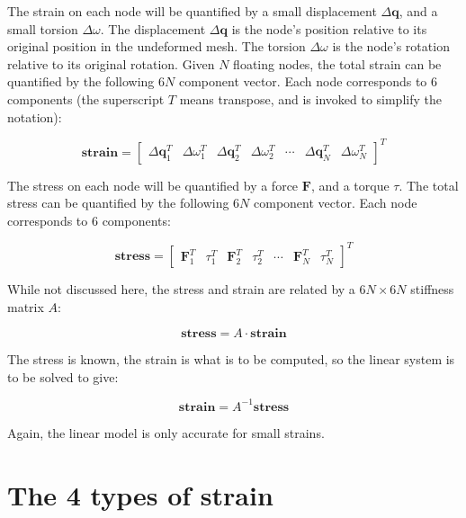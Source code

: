 \documentclass{article}
\begin{document}
The strain on each node will be quantified by a small displacement \(\Delta\mathbf{q}\), and a small torsion \(\Delta\omega\). The displacement \(\Delta\mathbf{q}\) is the node's position relative to its original position in the undeformed mesh. The torsion \(\Delta\omega\) is the node's rotation relative to its original rotation. Given \(N\) floating nodes, the total strain can be quantified by the following \(6N\) component vector. Each node corresponds to \(6\) components (the superscript \(T\) means transpose, and is invoked to simplify the notation):

\[\textbf{strain} = \begin{bmatrix} \Delta\mathbf{q}_1^T & \Delta\omega_1^T & \Delta\mathbf{q}_2^T & \Delta\omega_2^T & \cdots & \Delta\mathbf{q}_N^T & \Delta\omega_N^T \end{bmatrix}^T\] 

The stress on each node will be quantified by a force \(\mathbf{F}\), and a torque \(\tau\). The total stress can be quantified by the following \(6N\) component vector. Each node corresponds to \(6\) components:

\[\textbf{stress} = \begin{bmatrix} \mathbf{F}_1^T & \tau_1^T & \mathbf{F}_2^T & \tau_2^T & \cdots & \mathbf{F}_N^T & \tau_N^T \end{bmatrix}^T\] 

While not discussed here, the stress and strain are related by a \(6N \times 6N\) stiffness matrix \(A\):

\[\textbf{stress} = A \cdot \textbf{strain}\]

The stress is known, the strain is what is to be computed, so the linear system is to be solved to give:

\[\textbf{strain} = A^{-1}\textbf{stress}\]

Again, the linear model is only accurate for small strains.



\section{The 4 types of strain}
\end{document}
